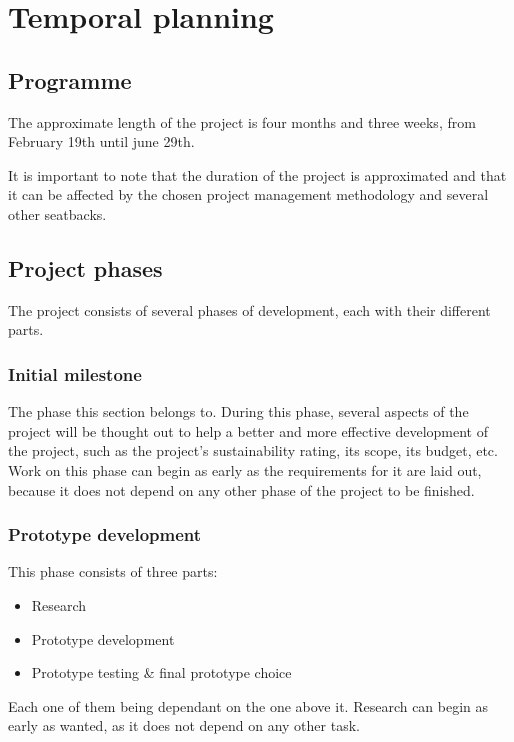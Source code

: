 \section{Temporal planning}

\subsection{Programme}

The approximate length of the project is four months and three weeks, from 
February 19th until june 29th.

It is important to note that the duration of the project is approximated
and that it can be affected by the chosen project management methodology
and several other seatbacks.

\subsection{Project phases}

The project consists of several phases of development, each with their
different parts.

\subsubsection{Initial milestone}\label{initial}

The phase this section belongs to. During this phase, several aspects of the project will be thought out to help a better and more effective development of the project, such as the project's sustainability rating, its scope, its budget, etc. Work on this phase can begin as early as the requirements for it are laid out, because it does not depend on any other phase of the project to be finished.

\subsubsection{Prototype development}

This phase consists of three parts:

\begin{itemize}
    \item Research
    \item Prototype development
    \item Prototype testing \& final prototype choice 
\end{itemize}

Each one of them being dependant on the one above it. Research can begin as early as wanted, as it does not depend on any other task.

